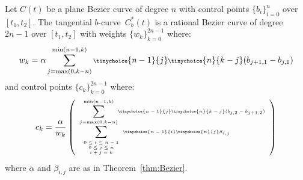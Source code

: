\documentclass[9pt,twocolumn]{article}
\newcommand{\tangs}{tangential curves\ }
\newcommand{\btang}{tangential $b$-curve\ }
\newcommand{\atangs}{tangential $a$-curves\ }
\begin{document}
\begin{theorem}
\label{thm:rationaldualb}
Let $C(t)$ be a plane Bezier curve of degree $n$ 
with control points $\{ b_i \}_{i=0}^n$ over $[t_1,t_2]$.
The \btang $C_b^*(t)$ is a rational Bezier curve of degree $2n-1$ 
over $[t_1,t_2]$ with weights $\{w_k\}_{k=0}^{2n-1}$ where: 
\begin{displaymath}
\scriptsize{
w_k = \alpha
\sum_{j=\mbox{max}(0,k-n)}^{\mbox{min}(n-1,k)} 
\tinychoice{n-1}{j} \tinychoice{n}{k-j} (b_{j+1,1} - b_{j,1})
}
\end{displaymath}
%
and control points $\{c_k\}_{k=0}^{2n-1}$ where:
\begin{displaymath}
\tiny{
c_k = \frac{\alpha}{w_k} 
\left(
\begin{array}{l}
	\displaystyle{\sum_{j=\mbox{\tiny{max}}(0,k-n)}^{\mbox{\tiny{min}}(n-1,k)}}
	\tinychoice{n-1}{j} \tinychoice{n}{k-j} (b_{j,2} - b_{j+1,2})\\
	\displaystyle{\sum_{\begin{array}{c} \mbox{\tiny{$0 \leq i \leq n-1$}} \\ 
			     \mbox{\tiny{$0 \leq j \leq n$}} \\ 
			     \mbox{\tiny{$i+j=k$}}
			     \end{array}}}
\tinychoice{n-1}{i} \tinychoice{n}{j} \beta_{i,j}
\end{array}
\right)
}
\end{displaymath}
where $\alpha$ and $\beta_{i,j}$ are as in Theorem~\ref{thm:Bezier}.
\end{theorem}

\clearpage
\onecolumn

\end{document}

